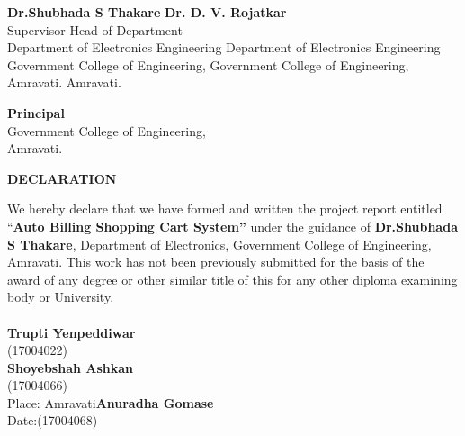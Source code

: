 \documentclass[12pt]{article}
\begin{document}
\vspace*{0.8 cm}
\begin{flushleft}
\hspace*{1cm}\textbf{Dr.Shubhada S Thakare}\hspace*{4.5 cm} \textbf{Dr. D. V. Rojatkar}  \\
\hspace*{2.5 cm}Supervisor \hspace*{6.2 cm} Head of Department \\
Department of Electronics Engineering \hspace*{2 cm}Department of Electronics Engineering\\
\hspace*{0.3 cm}Government College of Engineering, \hspace*{2.5 cm}Government College of Engineering,\\
\hspace*{2.5 cm}Amravati. \hspace*{7.3 cm}Amravati.
\end{flushleft}
\vspace*{0.8 cm}
\begin{flushleft}
\hspace*{2.5cm}\textbf{Principal}\\
\hspace*{0.3 cm}Government College of Engineering,\\
\hspace*{2.5 cm}Amravati.
\end{flushleft}

\newpage
{}
\begin{center}
\large\textbf{DECLARATION}
\end{center}
\hspace*{1 cm}We hereby declare that we have formed and written the project report entitled “\textbf{Auto Billing Shopping Cart System”} under the guidance of \textbf{Dr.Shubhada S Thakare}, Department of Electronics, Government College of Engineering, Amravati. This work has not been previously submitted for the basis of the award of any degree or other similar title of this for any other diploma examining body or University.\\
\vspace*{10cm}
\\
\hspace*{12cm}\textbf{Trupti Yenpeddiwar} \\
\hspace*{13cm}(17004022)\\
\hspace*{12cm}\textbf{Shoyebshah Ashkan} \\
\hspace*{13cm}(17004066)\\
Place: Amravati\hspace*{9cm}\textbf{Anuradha Gomase} \\
Date:\hspace*{12cm}(17004068)\\
\end{document}
